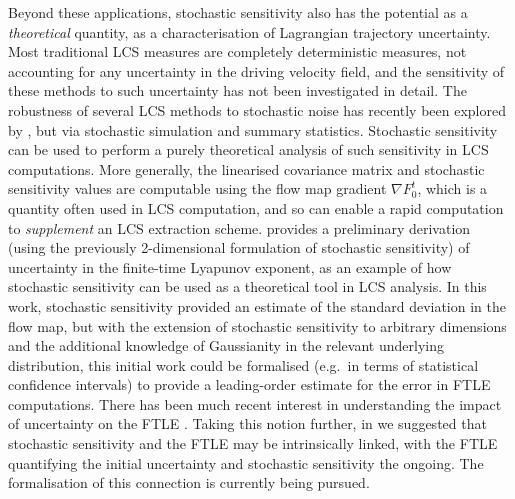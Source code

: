 Beyond these applications, stochastic sensitivity also has the potential as a \emph{theoretical} quantity, as a characterisation of Lagrangian trajectory uncertainty.
Most traditional LCS measures are completely deterministic measures, not accounting for any uncertainty in the driving velocity field, and the sensitivity of these methods to such uncertainty has not been investigated in detail.
The robustness of several LCS methods to stochastic noise has recently been explored by \citet{BadzaEtAl_2023_HowSensitiveAre}, but via stochastic simulation and summary statistics.
Stochastic sensitivity can be used to perform a purely theoretical analysis of such sensitivity in LCS computations.
More generally, the linearised covariance matrix and stochastic sensitivity values are computable using the flow map gradient \(\nabla F_0^t\), which is a quantity often used in LCS computation, and so can enable a rapid computation to \emph{supplement} an LCS extraction scheme.
\citet{Balasuriya_2020_UncertaintyFinitetimeLyapunov} provides a preliminary derivation (using the previously 2-dimensional formulation of stochastic sensitivity) of uncertainty in the finite-time Lyapunov exponent, as an example of how stochastic sensitivity can be used as a theoretical tool in LCS analysis.
In this work, stochastic sensitivity provided an estimate of the standard deviation in the flow map, but with the extension of stochastic sensitivity to arbitrary dimensions and the additional knowledge of Gaussianity in the relevant underlying distribution, this initial work could be formalised (e.g.\ in terms of statistical confidence intervals) to provide a leading-order estimate for the error in FTLE computations.
There has been much recent interest in understanding the impact of uncertainty on the FTLE \citep{Balasuriya_2020_UncertaintyFinitetimeLyapunov,YouLeung_2021_ComputingFiniteTime,GuoEtAl_2016_FiniteTimeLyapunovExponents}.
Taking this notion further, in  we suggested that stochastic sensitivity and the FTLE may be intrinsically linked, with the FTLE quantifying the initial uncertainty and stochastic sensitivity the ongoing.
The formalisation of this connection is currently being pursued.



